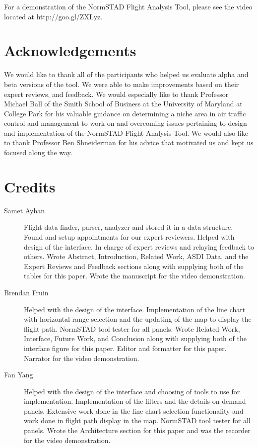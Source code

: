 \documentclass{sig-alternate}
\begin{document}
For a demonstration of the NormSTAD Flight Analysis Tool, please see the video
located at http://goo.gl/ZXLyz.

\section{Acknowledgements}
\label{sec-acknowledgements}
We would like to thank all of the
participants who helped us evaluate alpha and
beta versions of the tool. We were able to make
improvements based on their expert reviews,
and feedback. We would especially like to thank
Professor Michael Ball of the Smith School of Business 
at the University of Maryland at College Park for his valuable guidance
on determining a niche area in air traffic control
and management to work on and overcoming issues
pertaining to design and implementation of the NormSTAD Flight
Analysis Tool. We would also like to thank
Professor Ben Shneiderman for his advice that
motivated us and kept us focused along the way.

\section{Credits}

\begin{description}
\item[Samet Ayhan]
Flight data finder, parser, analyzer and stored it in a data structure. Found 
and setup appointments for our expert reviewers. Helped with
design of the interface. In charge of expert reviews
and relaying feedback to others. Wrote Abstract, Introduction, Related Work, ASDI
Data, and the Expert Reviews and Feedback sections along with 
supplying both of the tables for this paper. Wrote the manuscript for the 
video demonstration.

\item[Brendan Fruin]
Helped with the design of the interface.
Implementation of the line chart with horizontal range selection and the 
updating of the map to display the flight path. NormSTAD tool tester for all
panels. Wrote Related Work, Interface, Future Work,
and Conclusion along with supplying both of the interface figure for this paper. 
Editor and formatter for this paper. Narrator for the video demonstration.

\item[Fan Yang]
Helped with the design of the interface and choosing of tools to use for implementation.
Implementation of the filters and the details on demand panels. Extensive
work done in the line chart selection functionality and work done in flight path
display in the map.
NormSTAD tool tester for all panels. Wrote the Architecture section for this paper
and was the recorder for the video demonstration.

\end{description}
\end{document}

